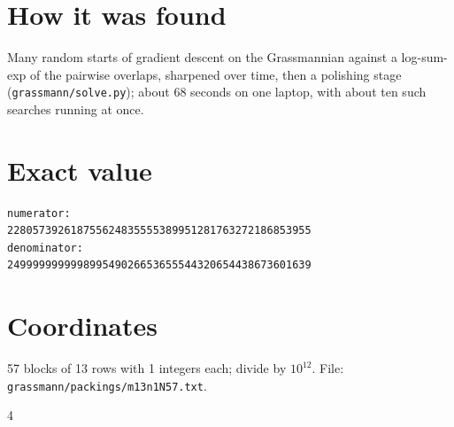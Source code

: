 \documentclass[11pt,a4paper]{article}
\begin{document}
\section{How it was found}
Many random starts of gradient descent on the Grassmannian against a log-sum-exp of the pairwise overlaps, sharpened over time, then a polishing stage (\texttt{grassmann/solve.py}); about 68 seconds on one laptop, with about ten such searches running at once.


\appendix
\section{Exact value}
{\small
\begin{verbatim}
numerator:
228057392618755624835555389951281763272186853955
denominator:
249999999999899549026653655544320654438673601639
\end{verbatim}}

\section{Coordinates}
57 blocks of 13 rows with 1 integers each; divide by $10^{12}$. File: \texttt{grassmann/packings/m13n1N57.txt}.
{\tiny
\begin{multicols}{4}
\end{multicols}}
\end{document}
